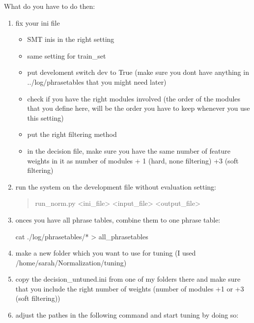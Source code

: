 \documentclass[letterpaper,10pt,english]{sphinxmanual}
\begin{document}
What do you have to do then:
\begin{enumerate}
\item {} 
fix your ini file
\begin{itemize}
\item {} 
SMT inis in the right setting

\item {} 
same setting for train\_set

\item {} 
put develoment switch dev to True (make sure you dont have anything in ../log/phrasetables that you might need later)

\item {} 
check if you have the right modules involved (the order of the modules that you define here, will be the order you have to keep whenever you use this setting)

\item {} 
put the right filtering method

\item {} 
in the decision file, make sure you have the same number of feature weights in it as number of modules + 1 (hard, none filtering) +3 (soft filtering)

\end{itemize}

\item {} 
run the system on the development file without evaluation setting:
\begin{quote}

run\_norm.py \textless{}ini\_file\textgreater{} \textless{}input\_file\textgreater{} \textless{}output\_file\textgreater{}
\end{quote}

\item {} 
onces you have all phrase tables, combine them to one phrase table:

cat ./log/phrasetables/* \textgreater{} all\_phrasetables

\item {} 
make a new folder which you want to use for tuning (I used /home/sarah/Normalization/tuning)

\item {} 
copy the decision\_untuned.ini from one of my folders there and make sure that you include the right number of weights (number of modules +1 or +3 (soft filtering))

\item {} 
adjust the pathes in the following command and start tuning by doing so:
\begin{quote}


\end{quote}
\end{enumerate}
\end{document}
